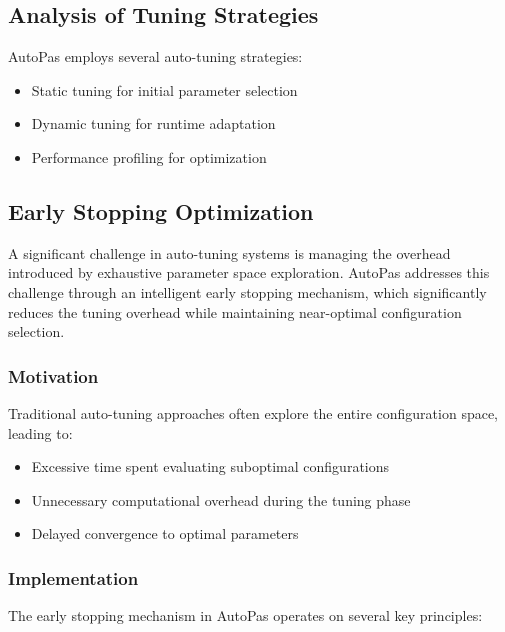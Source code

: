 \documentclass[conference]{IEEEtran}
\begin{document}
\subsection{Analysis of Tuning Strategies}

AutoPas employs several auto-tuning strategies:

\begin{itemize}
    \item Static tuning for initial parameter selection
    \item Dynamic tuning for runtime adaptation
    \item Performance profiling for optimization
\end{itemize}



\subsection{Early Stopping Optimization}
A significant challenge in auto-tuning systems is managing the overhead introduced by exhaustive parameter space exploration. AutoPas addresses this challenge through an intelligent early stopping mechanism, which significantly reduces the tuning overhead while maintaining near-optimal configuration selection.

\subsubsection{Motivation}
Traditional auto-tuning approaches often explore the entire configuration space, leading to:
\begin{itemize}
    \item Excessive time spent evaluating suboptimal configurations
    \item Unnecessary computational overhead during the tuning phase
    \item Delayed convergence to optimal parameters
\end{itemize}

\subsubsection{Implementation}
The early stopping mechanism in AutoPas operates on several key principles:
\end{document}
